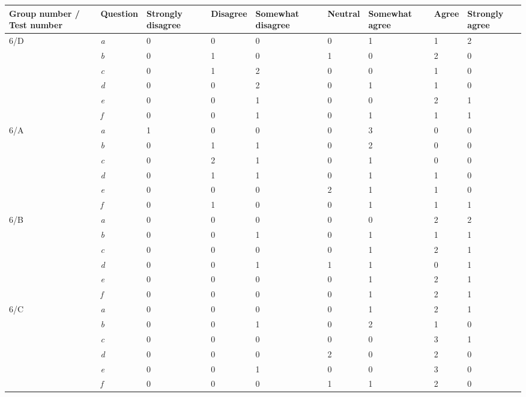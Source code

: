 \begin{center}\small \label{Test6}
	\begin{tabular}{ p{1.4cm} | p{1.4cm} | p{1.3cm} | p{1.4cm} | p{1.7cm} | p{1.2cm} | p{1.7cm} | p{0.9cm}| p{1.3cm} |}
\hline
\textbf{Group number / Test 	number} &\textbf{Question}	&	\textbf{Strongly disagree}	&	\textbf{Disagree}	&	\textbf{Somewhat disagree}	&	\textbf{Neutral}	&	\textbf{Somewhat agree}	&	\textbf{Agree}	&	\textbf{Strongly agree} \\ \hline		
6/D		&	\textit{a}	&	0	&	0	&	0	&	0	&	1	&	1	&	2	\\ \hline
		&	\textit{b}	&	0	&	1	&	0	&	1	&	0	&	2	&	0	\\ \hline
		&	\textit{c}	&	0	&	1	&	2	&	0	&	0	&	1	&	0	\\ \hline
		&	\textit{d}	&	0	&	0	&	2	&	0	&	1	&	1	&	0	\\ \hline
		&	\textit{e}	&	0	&	0	&	1	&	0	&	0	&	2	&	1	\\ \hline
		&	\textit{f}	&	0	&	0	&	1	&	0	&	1	&	1	&	1	\\ \hline
6/A		&	\textit{a}	&	1	&	0	&	0	&	0	&	3	&	0	&	0	\\ \hline
		&	\textit{b}	&	0	&	1	&	1	&	0	&	2	&	0	&	0	\\ \hline
		&	\textit{c}	&	0	&	2	&	1	&	0	&	1	&	0	&	0	\\ \hline
		&	\textit{d}	&	0	&	1	&	1	&	0	&	1	&	1	&	0	\\ \hline
		&	\textit{e}	&	0	&	0	&	0	&	2	&	1	&	1	&	0	\\ \hline
		&	\textit{f}	&	0	&	1	&	0	&	0	&	1	&	1	&	1	\\ \hline
6/B		&	\textit{a}	&	0	&	0	&	0	&	0	&	0	&	2	&	2	\\ \hline
		&	\textit{b}	&	0	&	0	&	1	&	0	&	1	&	1	&	1	\\ \hline
		&	\textit{c}	&	0	&	0	&	0	&	0	&	1	&	2	&	1	\\ \hline
		&	\textit{d}	&	0	&	0	&	1	&	1	&	1	&	0	&	1	\\ \hline
		&	\textit{e}	&	0	&	0	&	0	&	0	&	1	&	2	&	1	\\ \hline
		&	\textit{f}	&	0	&	0	&	0	&	0	&	1	&	2	&	1	\\ \hline
6/C		&	\textit{a}	&	0	&	0	&	0	&	0	&	1	&	2	&	1	\\ \hline
		&	\textit{b}	&	0	&	0	&	1	&	0	&	2	&	1	&	0	\\ \hline
		&	\textit{c}	&	0	&	0	&	0	&	0	&	0	&	3	&	1	\\ \hline
		&	\textit{d}	&	0	&	0	&	0	&	2	&	0	&	2	&	0	\\ \hline
		&	\textit{e}	&	0	&	0	&	1	&	0	&	0	&	3	&	0	\\ \hline
		&	\textit{f}	&	0	&	0	&	0	&	1	&	1	&	2	&	0	\\ \hline
	\end{tabular}
\end{center}


